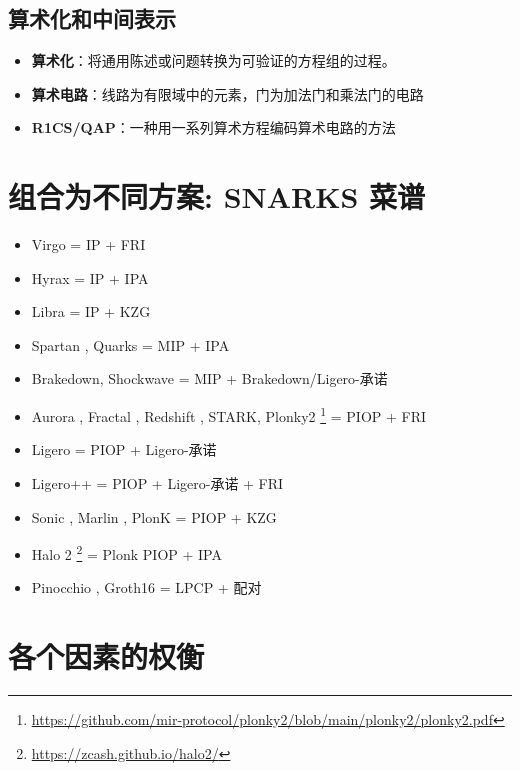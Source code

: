 \documentclass[runningheads]{llncs}
\begin{document}
\subsection*{算术化和中间表示}
\begin{itemize}
  \item \textbf{算术化}：将通用陈述或问题转换为可验证的方程组的过程。
  \item \textbf{算术电路}：线路为有限域中的元素，门为加法门和乘法门的电路
  \item \textbf{R1CS/QAP}：一种用一系列算术方程编码算术电路的方法
\end{itemize}


\section{组合为不同方案: SNARKS 菜谱}


\begin{itemize}
  \item Virgo \cite{ZXZ20} = IP + FRI
  \item Hyrax \cite{WTS18} = IP + IPA
  \item Libra \cite{XZZ19} = IP + KZG
  \item Spartan \cite{Setty20}, Quarks \cite{SL20} = MIP + IPA
  \item Brakedown, Shockwave \cite{GLS21} = MIP + Brakedown/Ligero-承诺
  \item Aurora \cite{BCR19}, Fractal \cite{COS20}, Redshift \cite{KPV19}, STARK\cite{BBH19}, Plonky2 \footnote{\url{https://github.com/mir-protocol/plonky2/blob/main/plonky2/plonky2.pdf}} = PIOP + FRI
  \item Ligero \cite{AHI17} = PIOP + Ligero-承诺
  \item Ligero++ \cite{BFH20}= PIOP + Ligero-承诺 + FRI
  \item Sonic \cite{MBK19} ,  Marlin \cite{CHM20} ,  PlonK \cite{GWC19} = PIOP + KZG
  \item Halo 2 \footnote{\url{https://zcash.github.io/halo2/}} = Plonk PIOP + IPA
  \item Pinocchio \cite{PHG13}, Groth16 \cite{Groth16} = LPCP + 配对
\end{itemize}








\section{各个因素的权衡}
\end{document}
